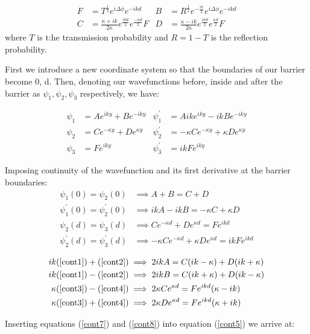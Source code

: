 \documentclass{article}
\begin{document}
\begin{align}
	F &= T^{\frac{1}{2}}e^{i\Delta\phi}e^{-ikd} & B &= R^{\frac{1}{2}}e^{-\frac{i\pi}{2}}e^{i\Delta\phi}e^{-ikd} \nonumber \\
	C &= \frac{\kappa+ik}{2\kappa}e^{\frac{ikd}{2}}e^{\frac{-\kappa d}{2}}F & D &= \frac{\kappa-ik}{2\kappa}e^{\frac{ikd}{2}}e^{\frac{\kappa d}{2}}F
\end{align}
where $T$ is t:he transmission probability and $R = 1-T$ is the reflection probability.

First we introduce a new coordinate system so that the boundaries of our barrier become 0, d. Then, denoting our wavefunctions before, inside and after the barrier as $\psi_{1}, \psi_{2}, \psi_{3}$ respectively, we have:

\begin{align}
	\psi_{1} &= Ae^{iky} + Be^{-iky} & \psi_{1}^{'} &= Aike^{iky} - ikBe^{-iky} \\
	\psi_{2} &= Ce^{-\kappa y} + De^{\kappa y} & \psi_{2}^{'} &= -\kappa Ce^{-\kappa y} + \kappa De^{\kappa y} \\
	\psi_{3} &= Fe^{iky} & \psi_{3}^{'} &= ikFe^{iky}
\end{align}

Imposing continuity of the wavefunction and its first derivative at the barrier boundaries:
\begin{align}
	\psi_{1}(0) = \psi_{2}(0) &\implies A+B = C+D \\
	\psi_{1}^{'}(0) = \psi_{2}^{'}(0) &\implies ikA - ikB = -\kappa C + \kappa D \\
	\psi_{2}(d) = \psi_{3}(d) &\implies Ce^{-\kappa d} + De^{\kappa d} = Fe^{ikd} \\
	\psi_{2}^{'}(d) = \psi_{3}^{'}(d) &\implies -\kappa Ce^{-\kappa d} + \kappa De^{\kappa d} = ikF e^{ikd} 
\end{align}

\begin{align}
	ik(\ref{cont1})+(\ref{cont2}) &\implies 2ikA = C(ik-\kappa)+D(ik+\kappa) \\
	ik(\ref{cont1})-(\ref{cont2}) &\implies 2ikB = C(ik+\kappa)+D(ik-\kappa) \\
	\kappa(\ref{cont3})-(\ref{cont4}) &\implies 2\kappa Ce^{\kappa d} = Fe^{ikd}(\kappa-ik)\\
	\kappa(\ref{cont3})+(\ref{cont4}) &\implies 2\kappa De^{\kappa d} = Fe^{ikd}(\kappa+ik) 
\end{align}

Inserting equations (\ref{cont7}) and (\ref{cont8}) into equation (\ref{cont5}) we arrive at:
\end{document}
